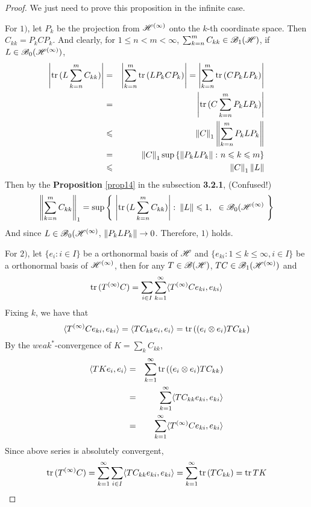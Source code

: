\documentclass[a4paper,11pt]{report}
\begin{document}
\begin{proof}
	We just need to prove this proposition in the infinite case.
	\item For $1)$, let $P_k$ be the projection from $\mathscr{H}^{(\infty)}$ onto the $k$-th coordinate space. Then $C_{kk} = P_k C P_k$. And clearly, for $1 \leqslant n < m < \infty$, $\sum_{k=n}^{m}C_{kk} \in \mathscr{B}_{1}\mathscr{(H)}$, if $L \in \mathscr{B}_0(\mathscr{H}^{(\infty)})$,
	\begin{eqnarray*}
		\left\lvert\operatorname{tr}{(L \sum_{k=n}^{m}C_{kk})}\right\lvert &=& \left\lvert\sum_{k=n}^{m} \operatorname{tr}{(LP_kCP_k)}\right\lvert = \left\lvert\sum_{k=n}^{m} \operatorname{tr}{(CP_kLP_k)}\right\lvert \\
		&=& \left\lvert\operatorname{tr}{(C \sum_{k=n}^{m} P_kLP_k)}\right\lvert \\
		&\leqslant& \left\lVert C\right\lVert_1 \left\lVert\sum_{k=n}^{m} P_kLP_k\right\lVert \\
		&=& \left\lVert C\right\lVert_1 \sup{\{\left\lVert P_kLP_k\right\lVert \colon n \leqslant k \leqslant m\}} \\
		&\leqslant& \left\lVert C\right\lVert_1 \left\lVert L\right\lVert
	\end{eqnarray*}
	Then by the \textbf{Proposition} \ref{prop14} in the subsection \textbf{3.2.1}, (Confused!)
	\begin{equation*}
		\left\lVert\sum_{k=n}^{m}C_{kk}\right\lVert_1 = \sup{\left\{~\left\lvert\operatorname{tr}{(L\sum_{k=n}^{m}C_{kk})}\right\lvert \colon \left\lVert L\right\lVert \leqslant 1,~ \ \in \mathscr{B}_0(\mathscr{H}^{(\infty)}~\right\}}
	\end{equation*}
	And since $L \in \mathscr{B}_0(\mathscr{H}^{(\infty)}$, $\left\lVert P_kLP_k\right\lVert \rightarrow 0$. Therefore, $1)$ holds.
	\item For $2)$, let $\{e_i \colon i \in I\}$ be a orthonormal basis of $\mathscr{H}$ and $\{e_{ki} \colon 1 \leqslant k \leqslant \infty, i \in I\}$ be a orthonormal basis of $\mathscr{H}^{(\infty)}$, then for any $T \in \mathscr{B}(\mathscr{H})$, $TC \in \mathscr{B}_1(\mathscr{H}^{(\infty)})$ and
	\begin{equation*}
		\operatorname{tr}{(T^{(\infty)}C)} = \sum_{i \in I} \sum_{k=1}^{\infty} \langle T^{(\infty)}C e_{ki},e_{ki} \rangle
	\end{equation*}
	Fixing $k$, we have that
	\begin{equation*}
		\langle T^{(\infty)}Ce_{ki},e_{ki} \rangle = \langle TC_{kk}e_{i},e_{i} \rangle = \operatorname{tr}{((e_i \otimes e_i)TC_{kk})}
	\end{equation*}
	By the $weak^{*}$-convergence of $K = \sum_{k} C_{kk}$, 
	\begin{eqnarray*}
		\langle TKe_i,e_i \rangle &=& \sum_{k=1}^{\infty} \operatorname{tr}{((e_i \otimes e_i)TC_{kk})} \\
		&=& \sum_{k=1}^{\infty} \langle TC_{kk}e_{ki},e_{ki} \rangle \\
		&=& \sum_{k=1}^{\infty} \langle T^{(\infty)}Ce_{ki},e_{ki} \rangle
	\end{eqnarray*}
	Since above series is absolutely convergent, 
	\begin{equation*}
		\operatorname{tr}{(T^{(\infty)}C)} = \sum_{k=1}^{\infty} \sum_{i \in I} \langle TC_{kk}e_{ki},e_{ki} \rangle = \sum_{k=1}^{\infty} \operatorname{tr}{(TC_{kk})} = \operatorname{tr}{TK}
	\end{equation*}
\end{proof}
\end{document}
